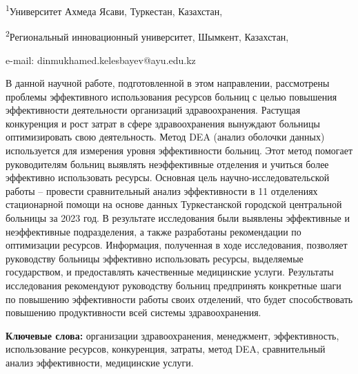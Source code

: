 \begin{affiliation}
\textsuperscript{1}Университет Ахмеда Ясави, Туркестан, Казахстан,

\textsuperscript{2}Региональный инновационный университет, Шымкент, Казахстан,

e-mail: dinmukhamed.kelesbayev@ayu.edu.kz
\end{affiliation}

В данной научной работе, подготовленной в этом направлении, рассмотрены
проблемы эффективного использования ресурсов больниц с целью повышения
эффективности деятельности организаций здравоохранения. Растущая
конкуренция и рост затрат в сфере здравоохранения вынуждают больницы
оптимизировать свою деятельность. Метод DEA (анализ оболочки данных)
используется для измерения уровня эффективности больниц. Этот метод
помогает руководителям больниц выявлять неэффективные отделения и
учиться более эффективно использовать ресурсы. Основная цель
научно-исследовательской работы -- провести сравнительный анализ
эффективности в 11 отделениях стационарной помощи на основе данных
Туркестанской городской центральной больницы за 2023 год. В результате
исследования были выявлены эффективные и неэффективные подразделения, а
также разработаны рекомендации по оптимизации ресурсов. Информация,
полученная в ходе исследования, позволяет руководству больницы
эффективно использовать ресурсы, выделяемые государством, и
предоставлять качественные медицинские услуги. Результаты исследования
рекомендуют руководству больниц предпринять конкретные шаги по повышению
эффективности работы своих отделений, что будет способствовать повышению
продуктивности всей системы здравоохранения.

{\bfseries Ключевые слова:} организации здравоохранения, менеджмент,
эффективность, использование ресурсов, конкуренция, затраты, метод DEA,
сравнительный анализ эффективности, медицинские услуги.

